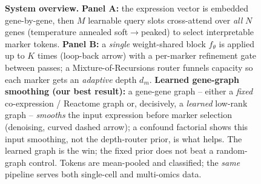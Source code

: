 \documentclass[letterpaper]{article}
\begin{document}
\begin{figure}[t]
{%
}
\caption{\textbf{System overview.} \textbf{Panel A:} the expression vector is embedded
gene-by-gene, then $M$ learnable query slots cross-attend over \emph{all} $N$ genes
(temperature annealed soft$\to$peaked) to select interpretable marker tokens.
\textbf{Panel B:} a \emph{single} weight-shared block $f_\theta$ is applied up to $K$
times (loop-back arrow) with a per-marker refinement gate between passes; a
Mixture-of-Recursions router funnels capacity so each marker gets an \emph{adaptive}
depth $d_m$. \textbf{Learned gene-graph smoothing (our best result):} a gene-gene graph --
either a \emph{fixed} co-expression / Reactome graph or, decisively, a \emph{learned}
low-rank graph -- \emph{smooths} the input expression before marker selection (denoising,
curved dashed arrow); a confound factorial shows this input smoothing, not the depth-router
prior, is what helps. The learned graph is the win; the fixed prior does not beat a
random-graph control. Tokens are mean-pooled and classified; the \emph{same}
pipeline serves both single-cell and multi-omics data.}
\label{fig:overview}
\end{figure}
\end{document}
